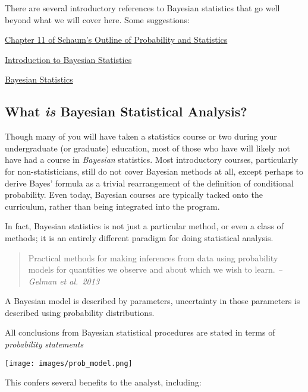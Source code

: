 \documentclass[11pt]{article}
\makeatletter
\def\maxwidth{\ifdim\Gin@nat@width>\linewidth\linewidth
    \else\Gin@nat@width\fi}
\let\Oldincludegraphics\includegraphics
\renewcommand{\includegraphics}[1]{\Oldincludegraphics[width=.8\maxwidth]{#1}}
\makeatother
\begin{document}
There are several introductory references to Bayesian statistics that go
well beyond what we will cover here. Some suggestions:

\href{https://www.kobo.com/us/en/ebook/schaum-s-outline-of-probability-and-statistics-4th-edition}{Chapter
11 of Schaum's Outline of Probability and Statistics}

\href{https://www.stat.auckland.ac.nz/~brewer/stats331.pdf}{Introduction
to Bayesian Statistics}

\href{https://www.york.ac.uk/depts/maths/histstat/pml1/bayes/book.htm}{Bayesian
Statistics}

\hypertarget{what-is-bayesian-statistical-analysis}{%
\subsection{\texorpdfstring{What \emph{is} Bayesian Statistical
Analysis?}{What is Bayesian Statistical Analysis?}}\label{what-is-bayesian-statistical-analysis}}

Though many of you will have taken a statistics course or two during
your undergraduate (or graduate) education, most of those who have will
likely not have had a course in \emph{Bayesian} statistics. Most
introductory courses, particularly for non-statisticians, still do not
cover Bayesian methods at all, except perhaps to derive Bayes' formula
as a trivial rearrangement of the definition of conditional probability.
Even today, Bayesian courses are typically tacked onto the curriculum,
rather than being integrated into the program.

In fact, Bayesian statistics is not just a particular method, or even a
class of methods; it is an entirely different paradigm for doing
statistical analysis.

\begin{quote}
Practical methods for making inferences from data using probability
models for quantities we observe and about which we wish to learn.
\emph{-- Gelman et al.~2013}
\end{quote}

A Bayesian model is described by parameters, uncertainty in those
parameters is described using probability distributions.

    All conclusions from Bayesian statistical procedures are stated in terms
of \emph{probability statements}

\texttt{[image: images/prob\_model.png]}

This confers several benefits to the analyst, including:
\end{document}
